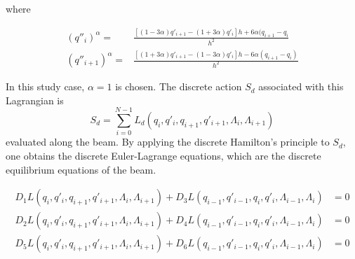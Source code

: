 where

\begin{align}
    (q''_i)^{\alpha} =& \frac{\left[ (1-3\alpha) q'_{i+1} - (1+3\alpha) q'_i \right] h + 6 \alpha (q_{i+1} - q_i}{h^2} \\
    (q''_{i+1})^{\alpha} =& \frac{\left[ (1+3\alpha) q'_{i+1} - (1-3\alpha) q'_i \right] h - 6 \alpha (q_{i+1} - q_i)}{h^2}
\end{align}


In this study case, $\alpha=1$ is chosen. The discrete action $S_d$ associated with this Lagrangian is
\begin{equation}
    S_d = \sum_{i=0}^{N-1} L_d \left( q_i, q'_i, q_{i+1}, q'_{i+1}, \Lambda_i, \Lambda_{i+1} \right)
\end{equation}
evaluated along the beam. By applying the discrete Hamilton's principle to $S_d$, one obtains the discrete Euler-Lagrange equations, which are the discrete equilibrium equations of the beam.

\begin{equation} 
\begin{split}
    D_1 L \left( q_i,q'_i,q_{i+1},q'_{i+1},\Lambda_{i},\Lambda_{i+1} \right) + D_3 L \left( q_{i-1},q'_{i-1},q_i,q'_i,\Lambda_{i-1}, \Lambda_{i} \right) &= 0 \\
    D_2 L \left( q_i,q'_i,q_{i+1},q'_{i+1},\Lambda_{i},\Lambda_{i+1} \right) + D_4 L \left( q_{i-1},q'_{i-1},q_i,q'_i,\Lambda_{i-1},\Lambda_{i} \right) &= 0 \\
    D_5 L \left( q_i,q'_i,q_{i+1},q'_{i+1},\Lambda_{i},\Lambda_{i+1} \right) + D_6 L \left( q_{i-1},q'_{i-1},q_i,q'_i,\Lambda_{i-1},\Lambda_{i} \right) &= 0
\end{split}
\end{equation}